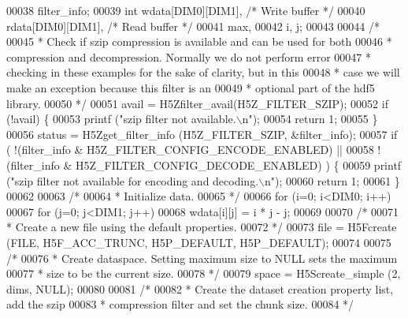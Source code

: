 \begin{DoxyCode}
00038                     filter\_info;
00039     \textcolor{keywordtype}{int}             wdata[DIM0][DIM1],          \textcolor{comment}{/* Write buffer */}
00040                     rdata[DIM0][DIM1],          \textcolor{comment}{/* Read buffer */}
00041                     max,
00042                     i, j;
00043 
00044     \textcolor{comment}{/*}
00045 \textcolor{comment}{     * Check if szip compression is available and can be used for both}
00046 \textcolor{comment}{     * compression and decompression.  Normally we do not perform error}
00047 \textcolor{comment}{     * checking in these examples for the sake of clarity, but in this}
00048 \textcolor{comment}{     * case we will make an exception because this filter is an}
00049 \textcolor{comment}{     * optional part of the hdf5 library.}
00050 \textcolor{comment}{     */}
00051     avail = H5Zfilter\_avail(H5Z\_FILTER\_SZIP);
00052     \textcolor{keywordflow}{if} (!avail) \{
00053         printf (\textcolor{stringliteral}{"szip filter not available.\(\backslash\)n"});
00054         \textcolor{keywordflow}{return} 1;
00055     \}
00056     status = H5Zget\_filter\_info (H5Z\_FILTER\_SZIP, &filter\_info);
00057     \textcolor{keywordflow}{if} ( !(filter\_info & H5Z\_FILTER\_CONFIG\_ENCODE\_ENABLED) ||
00058                 !(filter\_info & H5Z\_FILTER\_CONFIG\_DECODE\_ENABLED) ) \{
00059         printf (\textcolor{stringliteral}{"szip filter not available for encoding and decoding.\(\backslash\)n"});
00060         \textcolor{keywordflow}{return} 1;
00061     \}
00062 
00063     \textcolor{comment}{/*}
00064 \textcolor{comment}{     * Initialize data.}
00065 \textcolor{comment}{     */}
00066     \textcolor{keywordflow}{for} (i=0; i<DIM0; i++)
00067         \textcolor{keywordflow}{for} (j=0; j<DIM1; j++)
00068             wdata[i][j] = i * j - j;
00069 
00070     \textcolor{comment}{/*}
00071 \textcolor{comment}{     * Create a new file using the default properties.}
00072 \textcolor{comment}{     */}
00073     file = H5Fcreate (FILE, H5F\_ACC\_TRUNC, H5P\_DEFAULT, H5P\_DEFAULT);
00074 
00075     \textcolor{comment}{/*}
00076 \textcolor{comment}{     * Create dataspace.  Setting maximum size to NULL sets the maximum}
00077 \textcolor{comment}{     * size to be the current size.}
00078 \textcolor{comment}{     */}
00079     space = H5Screate\_simple (2, dims, NULL);
00080 
00081     \textcolor{comment}{/*}
00082 \textcolor{comment}{     * Create the dataset creation property list, add the szip}
00083 \textcolor{comment}{     * compression filter and set the chunk size.}
00084 \textcolor{comment}{     */}

\end{DoxyCode}
